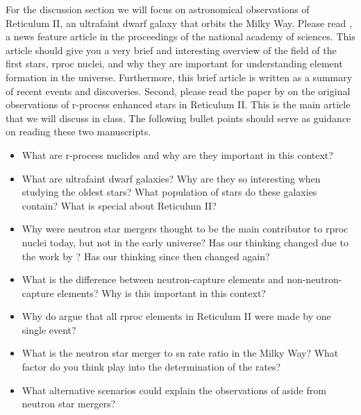 For the discussion section we will focus on astronomical observations of Reticulum II, an ultrafaint dwarf galaxy that orbits the Milky Way. Please read \citet{croswell21}, a news feature article in the proceedings of the national academy of sciences. This article should give you a very brief and interesting overview of the field of the first stars, \ac{rproc} nuclei, and why they are important for understanding element formation in the universe. Furthermore, this brief article is written as a summary of recent events and discoveries.
Second, please read the paper by \citet{ji16} on the original observations of r-process enhanced stars in Reticulum II. This is the main article that we will discuss in class. The following bullet points should serve as guidance on reading these two manuscripts.
\begin{itemize}
    \item What are r-process nuclides and why are they important in this context?
    \item What are ultrafaint dwarf galaxies? Why are they so interesting when studying the oldest stars? What population of stars do these galaxies contain? What is special about Reticulum II?
    \item Why were neutron star mergers thought to be the main contributor to \ac{rproc} nuclei today, but not in the early universe? Has our thinking changed due to the work by \citet{ji16}? Has our thinking since then changed again?
    \item What is the difference between neutron-capture elements and non-neutron-capture elements? Why is this important in this context?
    \item Why do \citet{ji16} argue that all \ac{rproc} elements in Reticulum II were made by one single event?
    \item What is the neutron star merger to \ac{sn} rate ratio in the Milky Way? What factor do you think play into the determination of the rates?
    \item What alternative scenarios could explain the observations of \citet{ji16} aside from neutron star mergers?
\end{itemize}